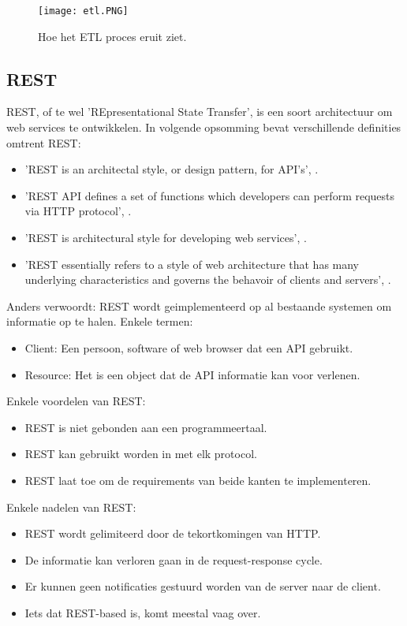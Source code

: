 \begin{figure}[h!]
	\texttt{[image: etl.PNG]}
	\centering
	\caption{Hoe het ETL proces eruit ziet. \textcite{Panolapy2019}}
\end{figure}

\subsection{REST}
REST, of te wel 'REpresentational State Transfer', is een soort architectuur om web services te ontwikkelen. In volgende opsomming bevat verschillende definities omtrent REST:
\begin{itemize}
	\item 'REST is an architectal style, or design pattern, for API's', \textcite{Avraham2017}.
	\item 'REST API defines a set of functions which developers can perform requests via HTTP protocol', \textcite{Deering2012}.
	\item 'REST is architectural style for developing web services', \textcite{Rouse2019}.
	\item 'REST essentially refers to a style of web architecture that has many underlying characteristics and governs the behavoir of clients and servers', \textcite{Deering2012}.
\end{itemize}

Anders verwoordt: REST wordt geimplementeerd op al bestaande systemen om informatie op te halen. 
Enkele termen:
\begin{itemize}
	\item Client: Een persoon, software of web browser dat een API gebruikt.
	\item Resource: Het is een object dat de API informatie kan voor verlenen.
\end{itemize}

Enkele voordelen van REST:
\begin{itemize}
	\item REST is niet gebonden aan een programmeertaal.
	\item REST kan gebruikt worden in met elk protocol.
	\item REST laat toe om de requirements van beide kanten te implementeren. 
\end{itemize}

Enkele nadelen van REST:
\begin{itemize}
	\item REST wordt gelimiteerd door de tekortkomingen van HTTP.
	\item De informatie kan verloren gaan in de request-response cycle.
	\item Er kunnen geen notificaties gestuurd worden van de server naar de client.
	\item Iets dat REST-based is, komt meestal vaag over.
\end{itemize} 

